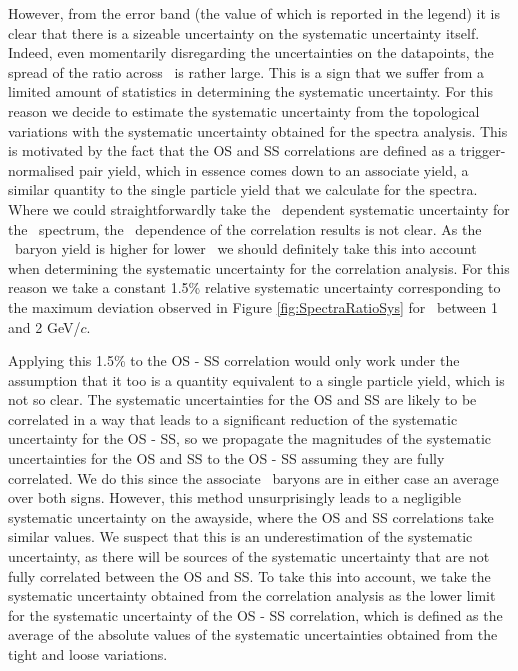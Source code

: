   However, from the error band (the value of which is reported in the legend) it is clear that there is a sizeable uncertainty on the systematic uncertainty itself. Indeed, even momentarily disregarding the uncertainties on the datapoints, the spread of the ratio across \dphi\ is rather large. This is a sign that we suffer from a limited amount of statistics in determining the systematic uncertainty. For this reason we decide to estimate the systematic uncertainty from the topological variations with the systematic uncertainty obtained for the spectra analysis. This is motivated by the fact that the OS and SS correlations are defined as a trigger-normalised pair yield, which in essence comes down to an associate yield, a similar quantity to the single particle yield that we calculate for the spectra.  
   Where we could straightforwardly take the \pt\ dependent systematic uncertainty for the \pt\ spectrum, the \pt\ dependence of the correlation results is not clear. As the \Xi\ baryon yield is higher for lower \pt\, we should definitely take this into account when determining the systematic uncertainty for the correlation analysis. For this reason we take a constant 1.5\% relative systematic uncertainty corresponding to the maximum deviation observed in Figure \ref{fig:SpectraRatioSys} for \pt\ between 1 and 2 GeV/$c$. 

  Applying this 1.5\% to the OS - SS correlation would only work under the assumption that it too is a quantity equivalent to a single particle yield, which is not so clear. The systematic uncertainties for the OS and SS are likely to be correlated in a way that leads to a significant reduction of the systematic uncertainty for the OS - SS, so we propagate the magnitudes of the systematic uncertainties for the OS and SS to the OS - SS assuming they are fully correlated. We do this since the associate \Xi\ baryons are in either case an average over both signs. However, this method unsurprisingly leads to a negligible systematic uncertainty on the awayside, where the OS and SS correlations take similar values. We suspect that this is an underestimation of the systematic uncertainty, as there will be sources of the systematic uncertainty that are not fully correlated between the OS and SS. To take this into account, we take the systematic uncertainty obtained from the correlation analysis as the lower limit for the systematic uncertainty of the OS - SS correlation, which is defined as the average of the absolute values of the systematic uncertainties obtained from the tight and loose variations. 

